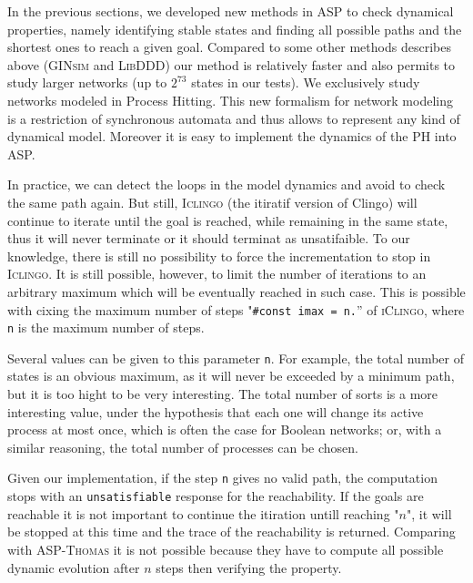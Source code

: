 In the previous sections,
we developed new methods in ASP to check dynamical properties,
namely identifying stable states and finding all possible paths and the shortest ones to reach a given goal.
Compared to some other methods describes above
(\textsc{GINsim} and \textsc{LibDDD}) our method is relatively faster and also permits to study larger networks
(up to $2^{73}$ states in our tests). We exclusively study networks modeled in Process Hitting. This new formalism for network modeling is a restriction of synchronous automata and thus allows to represent any kind of dynamical model. Moreover it is easy to implement the dynamics of the PH into ASP.

In practice, we can detect the loops in the model dynamics and avoid to check the same path again.
But still, \textsc{Iclingo} (the itiratif version of Clingo) will continue to iterate until the goal is reached, while remaining in the same state, thus it will never terminate or it should terminat as unsatifaible.
To our knowledge, there is still no possibility to force the incrementation to stop in \textsc{Iclingo}.
It is still possible, however, to limit the number of iterations to an arbitrary
maximum which will be eventually reached in such case.
This is possible with cixing the maximum number of steps "\texttt{\#const imax = n.}'' of \textsc{iClingo},
where \texttt{n} is the maximum number of steps.

Several values can be given to this parameter \texttt{n}.
For example, the total number of states is an obvious maximum,
as it will never be exceeded by a minimum path,
but it is too hight to be very interesting.
The total number of sorts is a more interesting value,
under the hypothesis that each one will change its active process at most once,
which is often the case for Boolean networks;
or, with a similar reasoning, the total number of processes can be chosen.

Given our implementation, if the step \texttt{n} gives no valid path,
the computation stops with an \texttt{unsatisfiable} response for the reachability. If the goals are reachable it is not important to continue the itiration untill reaching "$n$", it will be stopped at this time and the trace of the reachability is returned. Comparing with \textsc{ASP-Thomas} it is not possible because they have to compute all possible dynamic evolution after $n$ steps then verifying the property. 


